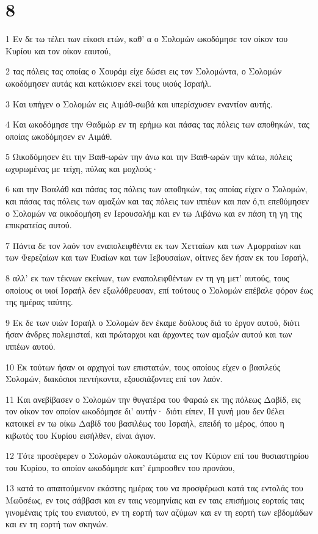 \chapter{8}

\par 1 Εν δε τω τέλει των είκοσι ετών, καθ' α ο Σολομών ωκοδόμησε τον οίκον του Κυρίου και τον οίκον εαυτού,
\par 2 τας πόλεις τας οποίας ο Χουράμ είχε δώσει εις τον Σολομώντα, ο Σολομών ωκοδόμησεν αυτάς και κατώκισεν εκεί τους υιούς Ισραήλ.
\par 3 Και υπήγεν ο Σολομών εις Αιμάθ-σωβά και υπερίσχυσεν εναντίον αυτής.
\par 4 Και ωκοδόμησε την Θαδμώρ εν τη ερήμω και πάσας τας πόλεις των αποθηκών, τας οποίας ωκοδόμησεν εν Αιμάθ.
\par 5 Ωικοδόμησεν έτι την Βαιθ-ωρών την άνω και την Βαιθ-ωρών την κάτω, πόλεις ωχυρωμένας με τείχη, πύλας και μοχλούς·
\par 6 και την Βααλάθ και πάσας τας πόλεις των αποθηκών, τας οποίας είχεν ο Σολομών, και πάσας τας πόλεις των αμαξών και τας πόλεις των ιππέων και παν ό,τι επεθύμησεν ο Σολομών να οικοδομήση εν Ιερουσαλήμ και εν τω Λιβάνω και εν πάση τη γη της επικρατείας αυτού.
\par 7 Πάντα δε τον λαόν τον εναπολειφθέντα εκ των Χετταίων και των Αμορραίων και των Φερεζαίων και των Ευαίων και των Ιεβουσαίων, οίτινες δεν ήσαν εκ του Ισραήλ,
\par 8 αλλ' εκ των τέκνων εκείνων, των εναπολειφθέντων εν τη γη μετ' αυτούς, τους οποίους οι υιοί Ισραήλ δεν εξωλόθρευσαν, επί τούτους ο Σολομών επέβαλε φόρον έως της ημέρας ταύτης.
\par 9 Εκ δε των υιών Ισραήλ ο Σολομών δεν έκαμε δούλους διά το έργον αυτού, διότι ήσαν άνδρες πολεμισταί, και πρώταρχοι και άρχοντες των αμαξών αυτού και των ιππέων αυτού.
\par 10 Εκ τούτων ήσαν οι αρχηγοί των επιστατών, τους οποίους είχεν ο βασιλεύς Σολομών, διακόσιοι πεντήκοντα, εξουσιάζοντες επί τον λαόν.
\par 11 Και ανεβίβασεν ο Σολομών την θυγατέρα του Φαραώ εκ της πόλεως Δαβίδ, εις τον οίκον τον οποίον ωκοδόμησε δι' αυτήν· διότι είπεν, Η γυνή μου δεν θέλει κατοικεί εν τω οίκω Δαβίδ του βασιλέως του Ισραήλ, επειδή το μέρος, όπου η κιβωτός του Κυρίου εισήλθεν, είναι άγιον.
\par 12 Τότε προσέφερεν ο Σολομών ολοκαυτώματα εις τον Κύριον επί του θυσιαστηρίου του Κυρίου, το οποίον ωκοδόμησε κατ' έμπροσθεν του προνάου,
\par 13 κατά το απαιτούμενον εκάστης ημέρας του να προσφέρωσι κατά τας εντολάς του Μωϋσέως, εν τοις σάββασι και εν ταις νεομηνίαις και εν ταις επισήμοις εορταίς ταις γινομέναις τρίς του ενιαυτού, εν τη εορτή των αζύμων και εν τη εορτή των εβδομάδων και εν τη εορτή των σκηνών.
